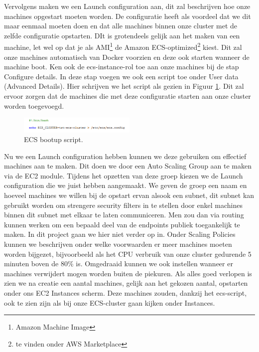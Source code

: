 \documentclass{article}
\begin{document}
	\par
	Vervolgens maken we een Launch configuration aan, dit zal beschrijven hoe onze machines opgestart moeten worden. De configuratie heeft als voordeel dat we dit maar eenmaal moeten doen en dat alle machines binnen onze cluster met de zelfde configuratie opstarten. DIt is grotendeels gelijk aan het maken van een machine, let wel op dat je als AMI\footnote{Amazon Machine Image} de Amazon ECS-optimized\footnote{te vinden onder AWS Marketplace} kiest. Dit zal onze machines automatisch van Docker voorzien en deze ook starten wanneer de machine boot. Ken ook de ecs-instance-rol toe aan onze machines bij de stap Configure details. In deze stap voegen we ook een script toe onder User data (Advanced Details). Hier schrijven we het script als gezien in Figuur \ref{fig:ecs-script}. Dit zal ervoor zorgen dat de machines die met deze configuratie starten aan onze cluster worden toegevoegd.
	\begin{figure}[h!]
		\centering
  		\includegraphics[width=0.5\textwidth]{images/ecs-script.PNG}
  		\caption{ECS bootup script.}
  		\label{fig:ecs-script}
	\end{figure}
	\par
	Nu we een Launch configuration hebben kunnen we deze gebruiken om effectief machines aan te maken. Dit doen we door een Auto Scaling Group aan te maken via de EC2 module. Tijdens het opzetten van deze groep kiezen we de Launch configuration die we juist hebben aangemaakt. We geven de groep een naam en hoeveel machines we willen bij de opstart ervan alsook een subnet, dit subnet kan gebruikt worden om strengere security filters in te stellen door enkel machines binnen dit subnet met elkaar te laten communiceren. Men zou dan via routing kunnen werken om een bepaald deel van de endpoints publiek toegankelijk te maken. In dit project gaan we hier niet verder op in. Onder Scaling Policies kunnen we beschrijven onder welke voorwaarden er meer machines moeten worden bijgezet, bijvoorbeeld als het CPU verbruik van onze cluster gedurende 5 minuten boven de 80\% is. Omgedraaid kunnen we ook instellen wanneer er machines verwijdert mogen worden buiten de piekuren. Als alles goed verlopen is zien we na creatie een aantal machines, gelijk aan het gekozen aantal, opstarten onder ons EC2 Instances scherm. Deze machines zouden, dankzij het ecs-script, ook te zien zijn als bij onze ECS-cluster gaan kijken onder Instances.
\end{document}
